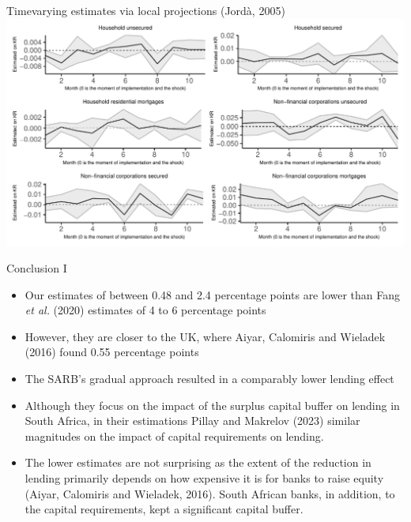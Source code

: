 \documentclass[
  14,
  ignorenonframetext,
  aspectratio=141,
]{beamer}
\providecommand{\tightlist}{%
  \setlength{\itemsep}{0pt}\setlength{\parskip}{0pt}}
\begin{document}
\begin{frame}{Timevarying estimates via local projections (Jordà, 2005)}
\protect\hypertarget{timevarying-estimates-via-local-projections-jorda2005estimation}{}
\includegraphics{baseIII_and_bank_lending_files/figure-beamer/path-1.pdf}
\end{frame}

\begin{frame}{Conclusion I}
\protect\hypertarget{conclusion-i}{}
\begin{itemize}
\tightlist
\item
  Our estimates of between 0.48 and 2.4 percentage points are lower than
  Fang \emph{et al.} (2020) estimates of 4 to 6 percentage points
\item
  However, they are closer to the UK, where Aiyar, Calomiris and
  Wieladek (2016) found 0.55 percentage points
\item
  The SARB's gradual approach resulted in a comparably lower lending
  effect
\item
  Although they focus on the impact of the surplus capital buffer on
  lending in South Africa, in their estimations Pillay and Makrelov
  (2023) similar magnitudes on the impact of capital requirements on
  lending.
\item
  The lower estimates are not surprising as the extent of the reduction
  in lending primarily depends on how expensive it is for banks to raise
  equity (Aiyar, Calomiris and Wieladek, 2016). South African banks, in
  addition, to the capital requirements, kept a significant capital
  buffer.
\end{itemize}
\end{frame}
\end{document}

